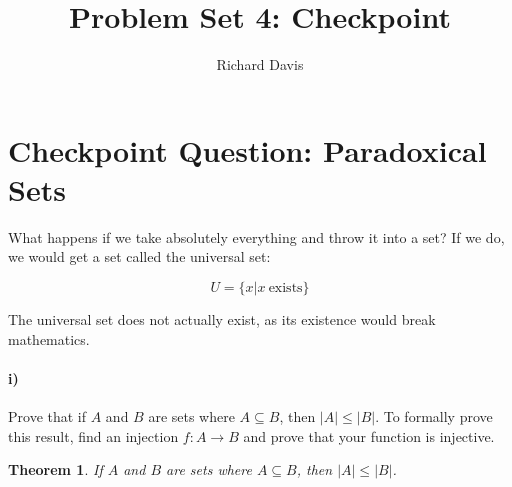 \documentclass[10pt,letter]{article}
\newtheorem*{thm}{Theorem}
\begin{document}

\title{Problem Set 4: Checkpoint}

\author{Richard Davis}

 
\maketitle 


\section*{Checkpoint Question: Paradoxical Sets}
What happens if we take absolutely everything and throw it into a set? If we do, we would get a set called the universal set:

\begin{equation}
U = \{ x | x \ \text{exists} \}
\end{equation}

The universal set does not actually exist, as its existence would break mathematics. 

\paragraph{i)} Prove that if $A$ and $B$ are sets where $A \subseteq B$, then $|A| \leq |B|$. To formally prove this result, find an injection $f:A \rightarrow B$ and prove that your function is injective.\\

\begin{thm} If $A$ and $B$ are sets where $A \subseteq B$, then $|A| \leq |B|$.
\end{thm}
\end{document}
